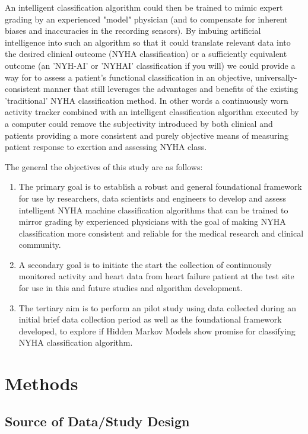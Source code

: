 \documentclass[]{article}
\begin{document}
An intelligent classification algorithm could then be trained to mimic expert grading by an experienced "model" physician (and to compensate for inherent biases and inaccuracies in the recording sensors). By imbuing artificial intelligence into such an algorithm so that it could translate relevant data into the desired clinical outcome (NYHA classification) or a sufficiently equivalent outcome (an 'NYH-AI' or 'NYHAI' classification if you will) we could provide a way for to assess a patient's functional classification in an objective, universally-consistent manner that still leverages the advantages and benefits of the existing 'traditional' NYHA classification method. In other words a continuously worn activity tracker combined with an intelligent classification algorithm executed by a computer could remove the subjectivity introduced by both clinical and patients providing a more consistent and purely objective means of measuring patient response to exertion and assessing NYHA class.

The general the objectives of this study are as follows:
\begin{enumerate}
	\item The primary goal is to establish a robust and general foundational framework for use by researchers, data scientists and engineers to develop and assess intelligent NYHA machine classification algorithms that can be trained to mirror grading by experienced physicians with the goal of making NYHA classification more consistent and reliable for the medical research and clinical community.
	\item A secondary goal is to initiate the start the collection of continuously monitored activity and heart data from heart failure patient at the test site for use in this and future studies and algorithm development.
	\item The tertiary aim is to perform an pilot study using data collected during an initial brief data collection period as well as the foundational framework developed, to explore if Hidden Markov Models show promise for classifying NYHA classification algorithm.
\end{enumerate}

	
\section{Methods}
\subsection{Source of Data/Study Design} %
\end{document}
